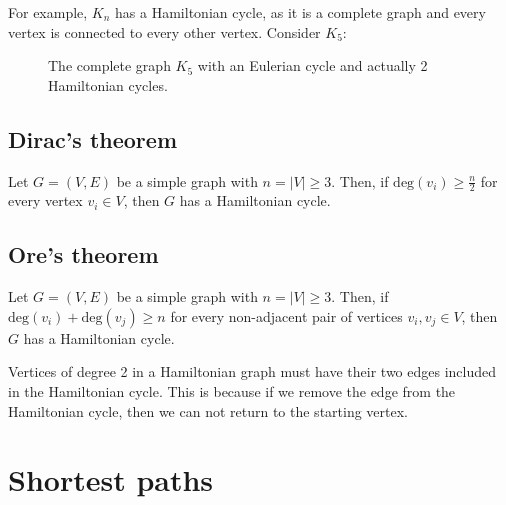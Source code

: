 \documentclass[11pt]{article}
\begin{document}
For example, $K_n$ has a Hamiltonian cycle, as it is a complete graph and every vertex is connected to every other vertex. Consider $K_5$:
\begin{figure}[H]
    \centering
    \caption{The complete graph $K_5$ with an Eulerian cycle and actually 2 Hamiltonian cycles.}
    \label{fig:graph_k5}
\end{figure}

\subsection{Dirac's theorem}
Let $G = (V,E)$ be a simple graph with $n = |V| \geq 3$. Then, if $\text{deg}(v_i) \geq \frac{n}{2}$ for every vertex $v_i \in V$, then $G$ has a Hamiltonian cycle.

\subsection{Ore's theorem}
Let $G = (V,E)$ be a simple graph with $n = |V| \geq 3$. Then, if $\text{deg}(v_i) + \text{deg}(v_j) \geq n$ for every non-adjacent pair of vertices $v_i, v_j \in V$, then $G$ has a Hamiltonian cycle.

Vertices of degree 2 in a Hamiltonian graph must have their two edges included in the Hamiltonian cycle. This is because if we remove the edge from the Hamiltonian cycle, then we can not return to the starting vertex. 

\section{Shortest paths}
\end{document}
